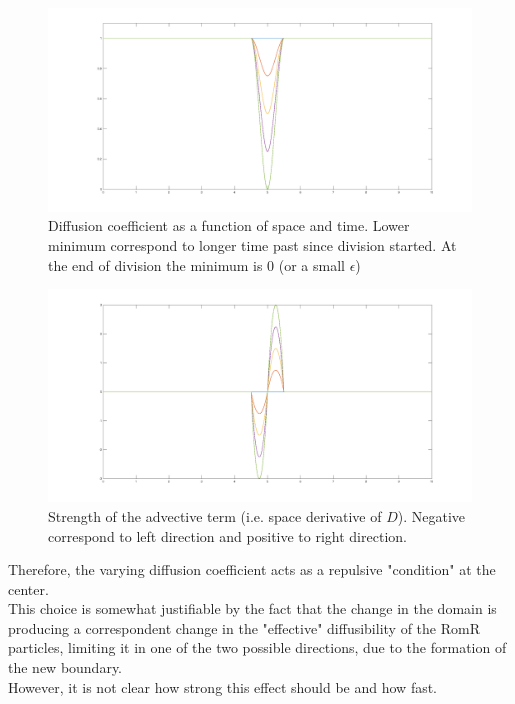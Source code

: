 \documentclass[12pt]{article}
\begin{document}
\begin{figure}[H]
    \centering
    \includegraphics[width=1.2\textwidth]{diffusion.jpeg}
    \caption{Diffusion coefficient as a function of space and time. Lower minimum correspond to longer time past since division started. At the end of division the minimum is 0 (or a small $\epsilon$)}
    \label{fig20}
\end{figure}

\begin{figure}[H]
    \centering
    \includegraphics[width=1.2\textwidth]{advection.jpeg}
    \caption{Strength of the advective term (i.e. space derivative of $D$). Negative correspond to left direction and positive to right direction. }
    \label{fig20}
\end{figure}

Therefore, the varying diffusion coefficient acts as a repulsive "condition" at the center.\\
This choice is somewhat justifiable by the fact that the change in the domain is producing a correspondent change in the "effective" diffusibility of the RomR particles, limiting it in one of the two possible directions, due to the formation of the new boundary.\\
However, it is not clear how strong this effect should be and how fast.\\\\
\end{document}
